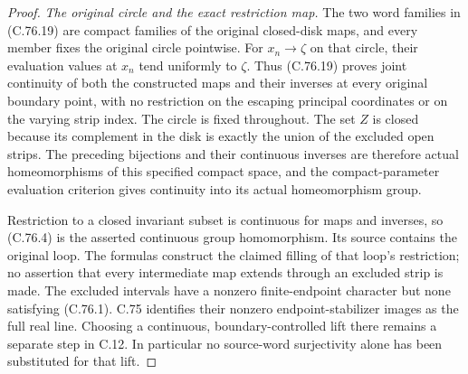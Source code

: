 \begin{proof}
\emph{The original circle and the exact restriction map.}
The two word families in (C.76.19) are compact families
of the original closed-disk maps, and every member
fixes the original circle pointwise. For $x_n\to\zeta$
on that circle, their evaluation values at $x_n$ tend
uniformly to $\zeta$. Thus (C.76.19) proves joint
continuity of both the constructed maps and their
inverses at every original boundary point, with no
restriction on the escaping principal coordinates
or on the varying strip index. The circle is fixed
throughout. The set $Z$ is closed because its complement
in the disk is exactly the union of the excluded open
strips. The preceding bijections and their continuous
inverses are therefore actual homeomorphisms of this
specified compact space, and the compact-parameter
evaluation criterion gives continuity into its actual
homeomorphism group.

Restriction to a closed invariant subset is continuous
for maps and inverses, so (C.76.4) is the asserted
continuous group homomorphism. Its source contains the
original loop. The formulas construct the claimed
filling of that loop's restriction; no assertion that
every intermediate map extends through an excluded
strip is made. The excluded intervals have a nonzero
finite-endpoint character but none satisfying (C.76.1).
C.75 identifies their nonzero endpoint-stabilizer images
as the full real line. Choosing a continuous,
boundary-controlled lift there remains a separate step
in C.12. In particular no source-word surjectivity alone
has been substituted for that lift.
\end{proof}
